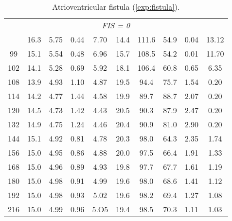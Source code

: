 \begin{table}
\begin{tabular}{cccccccccc}
    \multicolumn{10}{c}{\textit{FIS = 0}} \\
    \addlinespace[\paramchangeskip]
    97 & 16.3 & 5.75 & 0.44 & 7.70 & 14.4 & 111.6 & 54.9 & 0.04 & 13.12 \\
    99 & 15.1 & 5.54 & 0.48 & 6.96 & 15.7 & 108.5 & 54.2 & 0.01 & 11.70 \\
    102 & 14.1 & 5.28 & 0.69 & 5.92 & 18.1 & 106.4 & 60.8 & 0.65 & 6.35 \\
    108 & 13.9 & 4.93 & 1.10 & 4.87 & 19.5 & 94.4 & 75.7 & 1.54 & 0.20 \\
    114 & 14.2 & 4.77 & 1.44 & 4.58 & 19.9 & 89.7 & 88.7 & 2.07 & 0.20 \\
    120 & 14.5 & 4.73 & 1.42 & 4.43 & 20.5 & 90.3 & 87.9 & 2.47 & 0.20 \\
    132 & 14.9 & 4.75 & 1.24 & 4.46 & 20.4 & 90.9 & 81.0 & 2.90 & 0.20 \\
    144 & 15.1 & 4.92 & 0.81 & 4.78 & 20.3 & 98.0 & 64.3 & 2.35 & 1.74 \\
    156 & 15.0 & 4.95 & 0.86 & 4.88 & 20.0 & 97.5 & 66.4 & 1.91 & 1.33 \\
    168 & 15.0 & 4.96 & 0.89 & 4.93 & 19.8 & 97.7 & 67.7 & 1.61 & 1.19 \\
    180 & 15.0 & 4.98 & 0.91 & 4.99 & 19.6 & 98.0 & 68.6 & 1.41 & 1.12 \\
    192 & 15.0 & 4.98 & 0.93 & 5.02 & 19.6 & 98.2 & 69.4 & 1.27 & 1.08 \\
    216 & 15.0 & 4.99 & 0.96 & 5.O5 & 19.4 & 98.5 & 70.3 & 1.11 & 1.03 \\
    \bottomrule
  \end{tabular}
  \caption{Atrioventricular fistula (\autoref{exp:fistula}).}
  \label{tbl:fistula}
\end{table}
